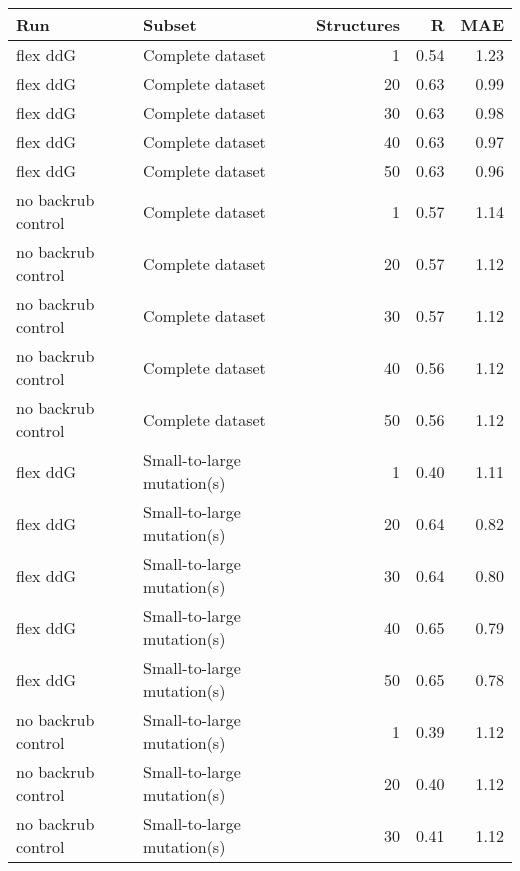 \begin{table}
\begin{tabular}{llrrr}
\toprule
                Run &                               Subset &  Structures &    R &  MAE \\
\midrule
           flex ddG &                     Complete dataset &           1 & 0.54 & 1.23 \\
           flex ddG &                     Complete dataset &          20 & 0.63 & 0.99 \\
           flex ddG &                     Complete dataset &          30 & 0.63 & 0.98 \\
           flex ddG &                     Complete dataset &          40 & 0.63 & 0.97 \\
           flex ddG &                     Complete dataset &          50 & 0.63 & 0.96 \\
 no backrub control &                     Complete dataset &           1 & 0.57 & 1.14 \\
 no backrub control &                     Complete dataset &          20 & 0.57 & 1.12 \\
 no backrub control &                     Complete dataset &          30 & 0.57 & 1.12 \\
 no backrub control &                     Complete dataset &          40 & 0.56 & 1.12 \\
 no backrub control &                     Complete dataset &          50 & 0.56 & 1.12 \\
           flex ddG &           Small-to-large mutation(s) &           1 & 0.40 & 1.11 \\
           flex ddG &           Small-to-large mutation(s) &          20 & 0.64 & 0.82 \\
           flex ddG &           Small-to-large mutation(s) &          30 & 0.64 & 0.80 \\
           flex ddG &           Small-to-large mutation(s) &          40 & 0.65 & 0.79 \\
           flex ddG &           Small-to-large mutation(s) &          50 & 0.65 & 0.78 \\
 no backrub control &           Small-to-large mutation(s) &           1 & 0.39 & 1.12 \\
 no backrub control &           Small-to-large mutation(s) &          20 & 0.40 & 1.12 \\
 no backrub control &           Small-to-large mutation(s) &          30 & 0.41 & 1.12 \\

\end{tabular}
\end{table}

